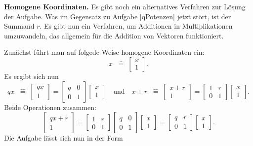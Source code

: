 \documentclass[a4paper,10pt,fleqn,twoside]{scrartcl}
\numberwithin{equation}{section}
\newcommand{\strong}[1]{{\sf\bfseries #1}}
\newcommand{\entspricht}{\;\;\hat =\;}
\theoremstyle{Aufgabe}
\begin{document}
\strong{Homogene Koordinaten.}
Es gibt noch ein alternatives Verfahren zur Lösung der Aufgabe.
Was im Gegensatz zu Aufgabe \ref{qPotenzen}
jetzt stört, ist der Summand $r$. Es gibt nun ein Verfahren, um
Additionen in Multiplikationen umzuwandeln, das allgemein für die
Addition von Vektoren funktioniert.

Zunächst führt man auf folgede Weise homogene Koordinaten ein:
\[ x\entspricht\begin{bmatrix}x\\ 1\end{bmatrix}.\]
Es ergibt sich nun
\[ qx\entspricht\begin{bmatrix}qx\\ 1\end{bmatrix}
= \begin{bmatrix}
q & 0\\
0 & 1
\end{bmatrix}
\begin{bmatrix}x\\ 1\end{bmatrix}
\quad\text{und}\quad
x+r\entspricht\begin{bmatrix}x+r\\ 1\end{bmatrix}
= \begin{bmatrix}
1 & r\\
0 & 1
\end{bmatrix}
\begin{bmatrix}x\\ 1\end{bmatrix}.\]
Beide Operationen zusammen:
\[\begin{bmatrix}qx+r\\ 1\end{bmatrix}
= \begin{bmatrix}
1 & r\\
0 & 1
\end{bmatrix}
\begin{bmatrix}
q & 0\\
0 & 1
\end{bmatrix}
\begin{bmatrix}x\\ 1\end{bmatrix}
= \begin{bmatrix}
q & r\\
0 & 1
\end{bmatrix}
\begin{bmatrix}x\\ 1\end{bmatrix}.\]
Die Aufgabe lässt sich nun in der Form
\end{document}
